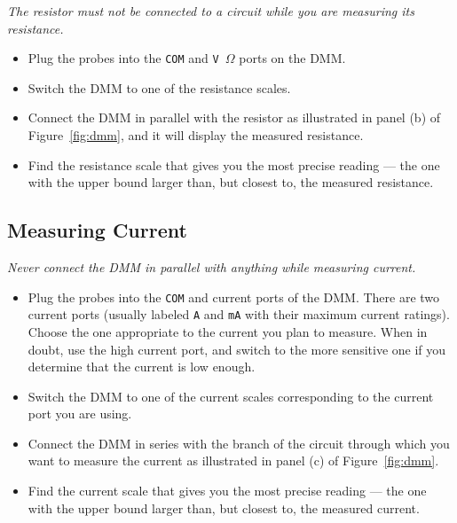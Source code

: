 \documentclass[11pt]{article}
\begin{document}
\emph{The resistor must not be connected to a circuit while you are
  measuring its resistance.}

\begin{itemize}
\item Plug the probes into the \texttt{COM} and \texttt{V\,$\Omega$}
  ports on the DMM.

\item Switch the DMM to one of the resistance scales.
  
\item Connect the DMM in parallel with the resistor as illustrated in
  panel (b) of Figure~\ref{fig:dmm}, and it will display the measured
  resistance.

\item Find the resistance scale that gives you the most
  precise reading --- the one with the upper bound larger than, but
  closest to, the measured resistance.
\end{itemize}

\subsection{Measuring Current}

\emph{Never connect the DMM in parallel with anything while measuring
  current.}

\begin{itemize}
\item Plug the probes into the \texttt{COM} and current ports of the
  DMM. There are two current ports (usually labeled \texttt{A} and
  \texttt{mA} with their maximum current ratings). Choose the one
  appropriate to the current you plan to measure. When in doubt, use
  the high current port, and switch to the more sensitive one if you
  determine that the current is low enough.

\item Switch the DMM to one of the current scales corresponding to the
  current port you are using.

\item Connect the DMM in series with the branch of the circuit through
  which you want to measure the current as illustrated in panel (c) of
  Figure~\ref{fig:dmm}.
  
\item Find the current scale that gives you the most precise reading
  --- the one with the upper bound larger than, but closest to, the
  measured current.
\end{itemize}
\end{document}
